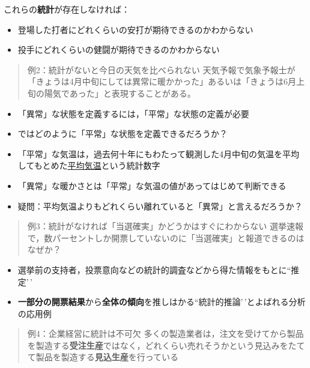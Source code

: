 \documentclass[
]{book}
\providecommand{\tightlist}{%
  \setlength{\itemsep}{0pt}\setlength{\parskip}{0pt}}
\theoremstyle{definition}
\theoremstyle{definition}
\theoremstyle{definition}
\theoremstyle{definition}
\theoremstyle{remark}
\begin{document}
これらの\textbf{統計}が存在しなければ：

\begin{itemize}
\tightlist
\item
  登場した打者にどれくらいの安打が期待できるのかわからない
\item
  投手にどれくらいの健闘が期待できるのかわからない
\end{itemize}

\begin{quote}
例2：統計がないと今日の天気を比べられない
天気予報で気象予報士が「きょうは4月中旬にしては異常に暖かかった」あるいは「きょうは6月上旬の陽気であった」と表現することがある。
\end{quote}

\begin{itemize}
\tightlist
\item
  「異常」な状態を定義するには，「平常」な状態の定義が必要
\item
  ではどのように「平常」な状態を定義できるだろうか？
\item
  「平常」な気温は，過去何十年にもわたって観測した4月中旬の気温を平均してもとめた\underline{平均気温}という統計数字
\item
  「異常」な暖かさとは「平常」な気温の値があってはじめて判断できる
\item
  疑問：平均気温よりもどれくらい離れていると「異常」と言えるだろうか？
\end{itemize}

\begin{quote}
例3：統計がなければ「当選確実」かどうかはすぐにわからない
選挙速報で，数パーセントしか開票していないのに「当選確実」と報道できるのはなぜか？
\end{quote}

\begin{itemize}
\tightlist
\item
  選挙前の支持者，投票意向などの統計的調査などから得た情報をもとに``推定'\,'
\item
  \textbf{一部分の開票結果}から\textbf{全体の傾向}を推しはかる``統計的推論'\,'とよばれる分析の応用例
\end{itemize}

\begin{quote}
例4：企業経営に統計は不可欠
多くの製造業者は，注文を受けてから製品を製造する\textbf{受注生産}ではなく，どれくらい売れそうかという見込みをたてて製品を製造する\textbf{見込生産}を行っている
\end{quote}
\end{document}
